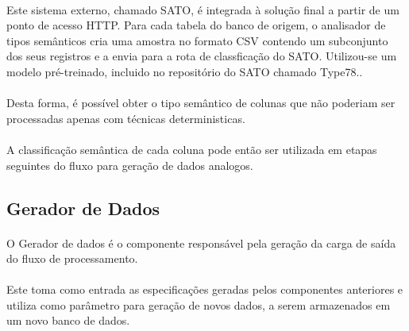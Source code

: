 \paragraph{} Este sistema externo, chamado SATO\cite{zhang2019sato}, é integrada à solução final a partir de um ponto de acesso HTTP. Para cada tabela do banco de origem, o analisador de tipos semânticos cria uma amostra no formato CSV contendo um subconjunto dos seus registros e a envia para a rota de classficação do SATO. Utilizou-se um modelo pré-treinado, incluido no repositório do SATO chamado Type78..

\paragraph{} Desta forma, é possível obter o tipo semântico de colunas que não poderiam ser processadas apenas com técnicas deterministicas.

\paragraph{} A classificação semântica de cada coluna pode então ser utilizada em etapas seguintes do fluxo para geração de dados analogos.

\subsection{Gerador de Dados}

\paragraph{} O Gerador de dados é o componente responsável pela geração da carga de saída do fluxo de processamento. 

\paragraph{} Este toma como entrada as especificações geradas pelos componentes anteriores e utiliza como parâmetro para geração de novos dados, a serem armazenados em um novo banco de dados.


